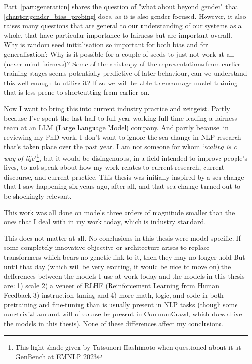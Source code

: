 Part~\ref{part:generation} shares the question of "what about beyond gender" that \ref{chapter:gender_bias_probing} does, as it is also gender focused. However, it also raises many questions that are general to our understanding of our systems as a whole, that have particular importance to fairness but are important overall. Why is random seed initialisation so important for both bias and for generalisation? Why is it possible for a couple of seeds to just not work at all (never mind fairness)? Some of the anistropy of the representations from earlier training stages seems potentially predictive of later behaviour, can we understand this well enough to utilise it? If so we will be able to encourage model training that is less prone to shortcutting from earlier on. 

Now I want to bring this into current industry practice and zeitgeist. Partly because I've spent the last half to full year working full-time leading a fairness team at an LLM (Large Language Model) company. And partly because, in reviewing my PhD work, I don't want to ignore the sea change in NLP research that's taken place over the past year. I am not someone for whom `\textit{scaling is a way of life}'\footnote{This light shade given by Tatsunori Hashimoto when questioned about it at GenBench at EMNLP 2023}, but it would be disingenuous, in a field intended to improve people's lives, to not speak about how my work relates to current research, current discourse, and current practice. This thesis was initially inspired by a sea change that I saw happening six years ago, after all, and that sea change turned out to be shockingly relevant. 

This work was all done on models three orders of magnitude smaller than the ones that I deal with in my work today, which is industry standard. 

This does not matter at all. No conclusions in this thesis were model specific. If some completely innovative objective or architecture arises to replace transformers \citep{vaswani} which bears no genetic link to it, then they may no longer hold But until that day (which will be very exciting, it would be nice to move on) the defferences between the models I use at work today and the models in this thesis are: 1) scale 2) a veneer of RLHF (Reinforcement Learning from Human Feedback \citep{} 3) instruction tuning \citep{} and 4) more math, logic, and code in both pretraining and fine-tuning than is usually present in NLP tasks (though some non-trivial amount will of course be present in CommonCrawl, which does drive the models in this thesis). None of these differences affect my conclusions. 

